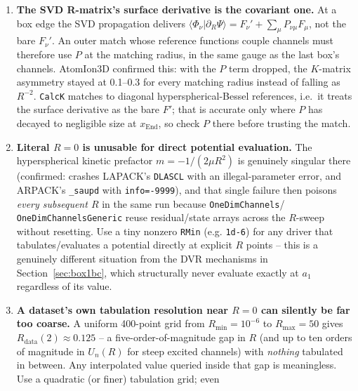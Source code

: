 \documentclass[11pt]{article}
\newcommand{\sub}[1]{\texttt{#1}}
\begin{document}
\begin{enumerate}[leftmargin=*]
  wide, which no energy scan resolves (at $x_{\text{End}}=15$ AtomIon3D's scan missed every compact
  level; at 5 it found them all). And driving the bisection to the pole sends $b_f\to\infty$, which
  makes \sub{BoxMatchEigensystem} \texttt{STOP} with ``selected a formally-infinite mode''; stop at
  $|1/b_f|<10^{-10}$. For counting levels exactly, without scanning at all, see
  Section~\ref{sec:validation}.
\item\label{got:covariant} \textbf{The SVD R-matrix's surface derivative is the covariant one.}
  At a box edge the SVD propagation delivers $\langle\Phi_\nu|\partial_R\Psi\rangle =
  F_\nu'+\sum_\mu P_{\nu\mu}F_\mu$, not the bare $F_\nu'$. An outer match whose reference functions
  couple channels must therefore use $P$ at the matching radius, in the same gauge as the last box's
  channels. AtomIon3D confirmed this: with the $P$ term dropped, the $K$-matrix asymmetry stayed at
  0.1--0.3 for every matching radius instead of falling as $R^{-2}$. \sub{CalcK} matches to
  diagonal hyperspherical-Bessel references, i.e.\ it treats the surface derivative as the bare
  $F'$; that is accurate only where $P$ has decayed to negligible size at $x_{\text{End}}$, so check
  $P$ there before trusting the match.
\item \textbf{Literal $R=0$ is unusable for direct potential evaluation.} The hyperspherical
  kinetic prefactor $m=-1/(2\mu R^2)$ is genuinely singular there (confirmed: crashes
  LAPACK's \texttt{DLASCL} with an illegal-parameter error, and ARPACK's \texttt{\_saupd} with
  \texttt{info=-9999}), and that single failure then
  poisons \emph{every subsequent $R$} in the same run because \sub{OneDimChannels}/
  \sub{OneDimChannelsGeneric} reuse residual/state arrays across the $R$-sweep without resetting.
  Use a tiny nonzero \texttt{RMin} (e.g. \texttt{1d-6}) for any driver that tabulates/evaluates a
  potential directly at explicit $R$ points -- this is a genuinely different situation from the
  DVR mechanisms in Section~\ref{sec:box1bc}, which structurally never evaluate exactly at $a_1$
  regardless of its value.
\item \textbf{A dataset's own tabulation resolution near $R=0$ can silently be far too coarse.}
  A uniform 400-point grid from $R_{\min}=10^{-6}$ to $R_{\max}=50$ gives $R_{\text{data}}(2)
  \approx0.125$ -- a five-order-of-magnitude gap in $R$ (and up to ten orders of magnitude in
  $U_n(R)$ for steep excited channels) with \emph{nothing} tabulated in between. Any interpolated
  value queried inside that gap is meaningless. Use a quadratic (or finer) tabulation grid; even

\end{enumerate}
\end{document}
